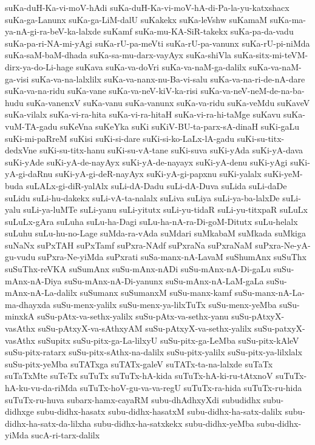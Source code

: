 {suKa-duH-Ka-vi-moV-hAdi
suKa-duH-Ka-vi-moV-hA-di-Pa-la-yu-katxshacx
suKa-ga-Lanunx
suKa-ga-LiM-dalU
suKakekx
suKa-leVshw
suKamaM
suKa-ma-ya-nA-gi-ra-beV-ka-lalxde
suKamf
suKa-mu-KA-SiR-takekx
suKa-pa-da-vadu
suKa-pa-ri-NA-mi-yAgi
suKa-rU-pa-meVti
suKa-rU-pa-vanunx
suKa-rU-pi-niMda
suKa-saM-baM-dhada
suKa-sa-mu-darx-vayAyx
suKa-shiVla
suKa-sitx-mi-teVM-dirx-ya-do-Li-hage
suKava
suKa-va-doVri
suKa-va-naM-ga-dalilx
suKa-va-naM-ga-visi
suKa-va-na-lalxlilx
suKa-va-nanx-nu-Ba-vi-salu
suKa-va-na-ri-de-nA-dare
suKa-va-na-ridu
suKa-vane
suKa-va-neV-kiV-ka-risi
suKa-va-neV-neM-de-na-ba-hudu
suKa-vanenxV
suKa-vanu
suKa-vanunx
suKa-va-ridu
suKa-veMdu
suKaveV
suKa-vilalx
suKa-vi-ra-hita
suKa-vi-ra-hitaH
suKa-vi-ra-hi-taMge
suKavu
suKa-vuM-TA-gadu
suKeVna
suKeYka
suKi
suKiV-BU-ta-parx-sA-dinaH
suKi-gaLu
suKi-mi-paRreM
suKisi
suKi-si-dare
suKi-si-ko-LaLx-lA-gadu
suKi-su-titx-dedxVne
suKi-su-titx-hanu
suKi-su-vA-tane
suKi-suva
suKi-yAda
suKi-yA-dava
suKi-yAde
suKi-yA-de-nayAyx
suKi-yA-de-nayayx
suKi-yA-denu
suKi-yAgi
suKi-yA-gi-daRnu
suKi-yA-gi-deR-nayAyx
suKi-yA-gi-papxnu
suKi-yalalx
suKi-yeM-buda
suLALx-gi-diR-yalAlx
suLi-dA-Dadu
suLi-dA-Duva
suLida
suLi-daDe
suLidu
suLi-hu-dakekx
suLi-vA-ta-nalalx
suLiva
suLiya
suLi-ya-ba-lalxDe
suLi-yalu
suLi-ya-luMTe
suLi-yanu
suLi-yitutx
suLi-yu-tidaR
suLi-yu-titxpaR
suLuLx
suLuLx-gAra
suLuha
suLu-ha-Dagi
suLu-ha-nA-ra-Di-goM-Ditutx
suLu-helalx
suLuhu
suLu-hu-no-Lage
suMda-ra-vAda
suMdari
suMkabaM
suMkada
suMkiga
suNaNx
suPxTAH
suPxTamf
suPxra-NAdf
suPxraNa
suPxraNaM
suPxra-Ne-yA-gu-vudu
suPxra-Ne-yiMda
suPxrati
suSa-manx-nA-LavaM
suShumAnx
suSuThx
suSuThx-reVKA
suSumAnx
suSu-mAnx-nADi
suSu-mAnx-nA-Di-gaLu
suSu-mAnx-nA-Diya
suSu-mAnx-nA-Di-yanunx
suSu-mAnx-nA-LaM-gaLa
suSu-mAnx-nA-La-dalilx
suSumanx
suSumanxM
suSu-manx-kamf
suSu-manx-nA-La-ma-dhayxda
suSu-menx-yalilx
suSu-menx-ya-lilxTuTx
suSu-menx-yeMba
suSu-minxkA
suSu-pAtx-va-sethx-yalilx
suSu-pAtx-va-sethx-yanu
suSu-pAtxyX-vasAthx
suSu-pAtxyX-va-sAthxyAM
suSu-pAtxyX-va-sethx-yalilx
suSu-patxyX-vasAthx
suSupitx
suSu-pitx-ga-La-lilxyU
suSu-pitx-ga-LeMba
suSu-pitx-kAleV
suSu-pitx-ratarx
suSu-pitx-sAthx-na-dalilx
suSu-pitx-yalilx
suSu-pitx-ya-lilxlalx
suSu-pitx-yeMba
suTATxga
suTATx-galeV
suTATx-ta-na-lalxde
suTaTx
suTaTxMte
suTeTx
suTuTx
suTuTx-hA-kida
suTuTx-hA-ki-ru-tAtxnoV
suTuTx-hA-ku-vu-da-riMda
suTuTx-hoV-gu-va-va-regU
suTuTx-ra-hida
suTuTx-ru-hida
suTuTx-ru-huva
subarx-hamx-cayaRM
subu-dhAdhxyXdi
subudidhx
subu-didhxge
subu-didhx-hasatx
subu-didhx-hasatxM
subu-didhx-ha-satx-dalilx
subu-didhx-ha-satx-da-lilxha
subu-didhx-ha-satxkekx
subu-didhx-yeMba
subu-didhx-yiMda
sucA-ri-tarx-dalilx
}
